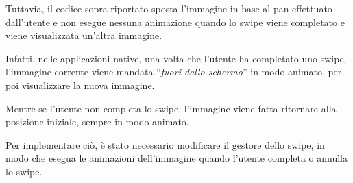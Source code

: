 \vspace{1em}
Tuttavia, il codice sopra riportato sposta l'immagine in base al pan effettuato dall'utente e non esegue nessuna animazione quando lo swipe viene completato e viene visualizzata un'altra immagine.

Infatti, nelle applicazioni native, una volta che l'utente ha completato uno swipe, l'immagine corrente viene mandata ``\textit{fuori dallo schermo}'' in modo animato, per poi visualizzare la nuova immagine.

Mentre se l'utente non completa lo swipe, l'immagine viene fatta ritornare alla posizione iniziale, sempre in modo animato.

Per implementare ciò, è stato necessario modificare il gestore dello swipe, in modo che esegua le animazioni dell'immagine quando l'utente completa o annulla lo swipe.

